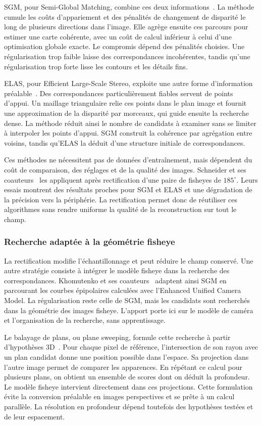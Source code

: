 \documentclass[11pt,a4paper]{article}
\begin{document}
SGM, pour Semi-Global Matching, combine ces deux informations~\cite{hirschmuller2008}. La méthode cumule les coûts d'appariement et des pénalités de changement de disparité le long de plusieurs directions dans l'image. Elle agrège ensuite ces parcours pour estimer une carte cohérente, avec un coût de calcul inférieur à celui d'une optimisation globale exacte. Le compromis dépend des pénalités choisies. Une régularisation trop faible laisse des correspondances incohérentes, tandis qu'une régularisation trop forte lisse les contours et les détails fins.

ELAS, pour Efficient Large-Scale Stereo, exploite une autre forme d'information préalable~\cite{geiger2010}. Des correspondances particulièrement fiables servent de points d'appui. Un maillage triangulaire relie ces points dans le plan image et fournit une approximation de la disparité par morceaux, qui guide ensuite la recherche dense. La méthode réduit ainsi le nombre de candidats à examiner sans se limiter à interpoler les points d'appui. SGM construit la cohérence par agrégation entre voisins, tandis qu'ELAS la déduit d'une structure initiale de correspondances.

Ces méthodes ne nécessitent pas de données d'entraînement, mais dépendent du coût de comparaison, des réglages et de la qualité des images. Schneider et ses coauteurs~\cite{schneider2016} les appliquent après rectification d'une paire de fisheyes de $185^\circ$. Leurs essais montrent des résultats proches pour SGM et ELAS et une dégradation de la précision vers la périphérie. La rectification permet donc de réutiliser ces algorithmes sans rendre uniforme la qualité de la reconstruction sur tout le champ.

\subsubsection{Recherche adaptée à la géométrie fisheye}
La rectification modifie l'échantillonnage et peut réduire le champ conservé. Une autre stratégie consiste à intégrer le modèle fisheye dans la recherche des correspondances. Khomutenko et ses coauteurs~\cite{khomutenko2016} adaptent ainsi SGM en parcourant les courbes épipolaires calculées avec l'Enhanced Unified Camera Model. La régularisation reste celle de SGM, mais les candidats sont recherchés dans la géométrie des images fisheye. L'apport porte ici sur le modèle de caméra et l'organisation de la recherche, sans apprentissage.

Le balayage de plans, ou plane sweeping, formule cette recherche à partir d'hypothèses 3D~\cite{haene2014}. Pour chaque pixel de référence, l'intersection de son rayon avec un plan candidat donne une position possible dans l'espace. Sa projection dans l'autre image permet de comparer les apparences. En répétant ce calcul pour plusieurs plans, on obtient un ensemble de scores dont on déduit la profondeur. Le modèle fisheye intervient directement dans ces projections. Cette formulation évite la conversion préalable en images perspectives et se prête à un calcul parallèle. La résolution en profondeur dépend toutefois des hypothèses testées et de leur espacement.
\end{document}
